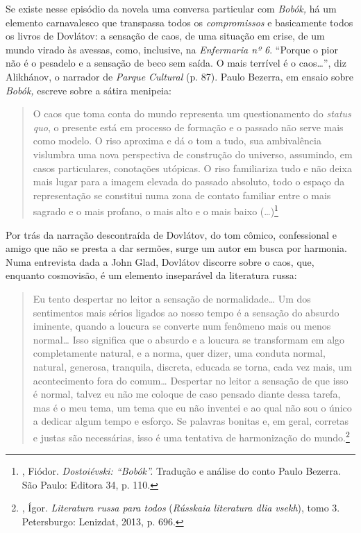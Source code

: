 Se existe nesse episódio da novela uma conversa particular com
\emph{Bobók,} há um elemento carnavalesco que transpassa todos os
\emph{compromissos} e basicamente todos os livros de Dovlátov: a
sensação de caos, de uma situação em crise, de um mundo virado às
avessas, como, inclusive, na \emph{Enfermaria nº 6}. ``Porque o pior não
é o pesadelo e a sensação de beco sem saída. O mais terrível é o
caos\ldots{}'', diz Alikhánov, o narrador de \emph{Parque Cultural} (p. 87).
Paulo Bezerra, em ensaio sobre \emph{Bobók,} escreve sobre a sátira
menipeia:

\begin{quote}
O caos que toma conta do mundo representa um questionamento do
\emph{status quo}, o presente está em processo de formação e o passado
não serve mais como modelo. O riso aproxima e dá o tom a tudo, sua
ambivalência vislumbra uma nova perspectiva de construção do universo,
assumindo, em casos particulares, conotações utópicas. O riso
familiariza tudo e não deixa mais lugar para a imagem elevada do passado
absoluto, todo o espaço da representação se constitui numa zona de
contato familiar entre o mais sagrado e o mais profano, o mais alto e o
mais baixo (\ldots{})\footnote{, Fiódor. \emph{Dostoiévski:
  ``Bobók''.} Tradução e análise do conto Paulo Bezerra. São Paulo:
  Editora 34, p. 110.}
\end{quote}

Por trás da narração descontraída de Dovlátov, do tom cômico,
confessional e amigo que não se presta a dar sermões, surge um autor em
busca por harmonia. Numa entrevista dada a John Glad, Dovlátov discorre
sobre o caos, que, enquanto cosmovisão, é um elemento inseparável da
literatura russa:

\begin{quote}
Eu tento despertar no leitor a sensação de normalidade\ldots{} Um dos
sentimentos mais sérios ligados ao nosso tempo é a sensação do absurdo
iminente, quando a loucura se converte num fenômeno mais ou menos
normal\ldots{} Isso significa que o absurdo e a loucura se transformam em
algo completamente natural, e a norma, quer dizer, uma conduta normal,
natural, generosa, tranquila, discreta, educada se torna, cada vez mais,
um acontecimento fora do comum\ldots{} Despertar no leitor a sensação de que
isso é normal, talvez eu não me coloque de caso pensado diante dessa
tarefa, mas é o meu tema, um tema que eu não inventei e ao qual não sou
o único a dedicar algum tempo e esforço. Se palavras bonitas e, em
geral, corretas e justas são necessárias, isso é uma tentativa de
harmonização do mundo.\footnote{, Ígor. \emph{Literatura russa
  para todos} (\emph{Rússkaia literatura dlia vsekh}), tomo 3.
  Petersburgo: Lenizdat, 2013, p. 696.}
\end{quote}

